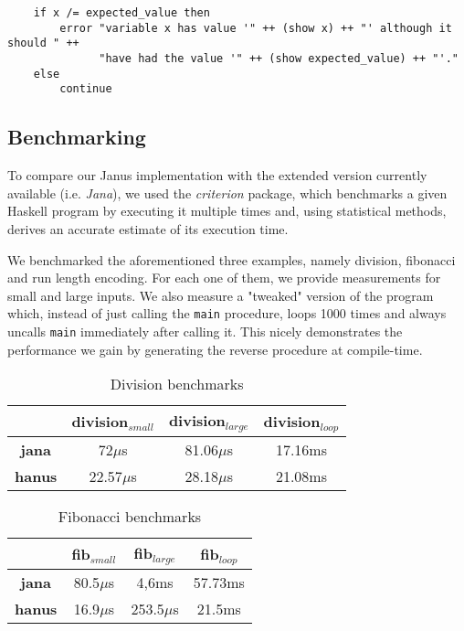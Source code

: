 \documentclass[12pt,a4paper]{article}
\newcommand{\inlinecode}[1]{\texttt{#1}}
\begin{document}
\begin{verbatim}
    if x /= expected_value then
        error "variable x has value '" ++ (show x) ++ "' although it should " ++
              "have had the value '" ++ (show expected_value) ++ "'."
    else
        continue
\end{verbatim}
    
\subsection{Benchmarking}
To compare our Janus implementation with the extended version currently available (i.e. \textit{Jana}), we used the \textit{criterion} package, which benchmarks a given Haskell program by executing it multiple times and, using statistical methods, derives an accurate estimate of its execution time.

We benchmarked the aforementioned three examples, namely division, fibonacci and run length encoding. For each one of them, we provide measurements for small and large inputs. We also measure a "tweaked" version of the program which, instead of just calling the \inlinecode{main} procedure, loops 1000 times and always uncalls \inlinecode{main} immediately after calling it. This nicely demonstrates the performance we gain by generating the reverse procedure at compile-time.

\begin{table}[h!]
\centering
\begin{tabular}{|c | c | c | c|}
\hline
& division$_{small}$ & division$_{large}$ & division$_{loop}$ \\
\hline
\textbf{jana} & 72$\mu$s & 81.06$\mu$s & 17.16ms \\
\textbf{hanus} & 22.57$\mu$s & 28.18$\mu$s & 21.08ms\\
\hline
\end{tabular}
\caption{Division benchmarks}
\end{table}

\begin{table}[h!]
\centering
\begin{tabular}{|c | c | c | c|}
\hline
& fib$_{small}$ & fib$_{large}$ & fib$_{loop}$ \\
\hline
\textbf{jana} & 80.5$\mu$s & 4,6ms & 57.73ms \\
\textbf{hanus} & 16.9$\mu$s & 253.5$\mu$s & 21.5ms\\
\hline
\end{tabular}
\caption{Fibonacci benchmarks}
\end{table}
\end{document}
